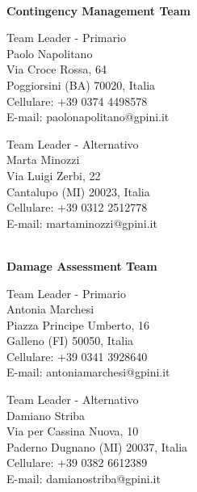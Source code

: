 \documentclass[12pt, a4paper, titlepage]{report}
\begin{document}
	\vspace{0.5cm}
	\centerline{\textbf{\\Contingency Management Team}}
	\begin{paracol}{2}
		\setlength{\columnsep}{5em}
		\begin{leftcolumn}
			\begin{adjustwidth}{0.5cm}{}
				Team Leader - Primario \\
				Paolo Napolitano \\
				Via Croce Rossa, 64\\ 
				Poggiorsini (BA) 70020, Italia 
				\\Cellulare:  +39 0374 4498578 \\
				E-mail: paolonapolitano@gpini.it 
			\end{adjustwidth}
		\end{leftcolumn}
		\begin{rightcolumn}
			\begin{adjustwidth}{0.5cm}{}
				Team Leader - Alternativo \\
				Marta Minozzi\\
				Via Luigi Zerbi, 22 \\ 
				Cantalupo (MI) 20023, Italia \\
				Cellulare:  +39 0312 2512778 \\
				E-mail: martaminozzi@gpini.it 
			\end{adjustwidth}
		\end{rightcolumn}
	\end{paracol}
	
	\vspace{0.5cm}
	\centerline{\textbf{\\Damage Assessment Team}}
	\begin{paracol}{2}
		\setlength{\columnsep}{5em}
		\begin{leftcolumn}
			\begin{adjustwidth}{0.5cm}{}
				Team Leader - Primario \\
				Antonia Marchesi \\
				Piazza Principe Umberto, 16\\ 
				Galleno (FI) 50050, Italia \\
				Cellulare:  +39 0341 3928640 \\
				E-mail:  antoniamarchesi@gpini.it 
			\end{adjustwidth}
		\end{leftcolumn}
		\begin{rightcolumn}
			\begin{adjustwidth}{0.5cm}{}
				Team Leader - Alternativo \\
				Damiano Striba\\
				Via per Cassina Nuova, 10\\
				Paderno Dugnano (MI) 20037, Italia \\
				Cellulare:  +39 0382 6612389\\
				E-mail: damianostriba@gpini.it 
			\end{adjustwidth}
		\end{rightcolumn}
	\end{paracol}
	\newpage
	
\end{document}
